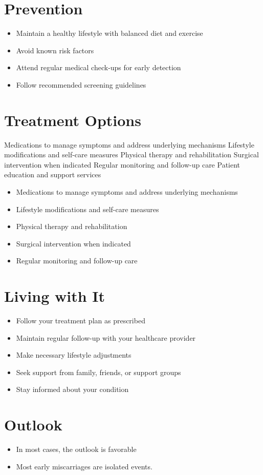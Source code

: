 \section{Prevention}
\begin{itemize}[noitemsep]
  \item Maintain a healthy lifestyle with balanced diet and exercise
  \item Avoid known risk factors
  \item Attend regular medical check-ups for early detection
  \item Follow recommended screening guidelines
\end{itemize}
\section{Treatment Options}
Medications to manage symptoms and address underlying mechanisms Lifestyle modifications and self-care measures Physical therapy and rehabilitation Surgical intervention when indicated Regular monitoring and follow-up care Patient education and support services

\begin{itemize}[noitemsep]
  \item Medications to manage symptoms and address underlying mechanisms
  \item Lifestyle modifications and self-care measures
  \item Physical therapy and rehabilitation
  \item Surgical intervention when indicated
  \item Regular monitoring and follow-up care
\end{itemize}
\section{Living with It}
\begin{itemize}[noitemsep]
  \item Follow your treatment plan as prescribed
  \item Maintain regular follow-up with your healthcare provider
  \item Make necessary lifestyle adjustments
  \item Seek support from family, friends, or support groups
  \item Stay informed about your condition
\end{itemize}
\section{Outlook}
\begin{itemize}[noitemsep]
  \item In most cases, the outlook is favorable
  \item Most early miscarriages are isolated events.
\end{itemize}
